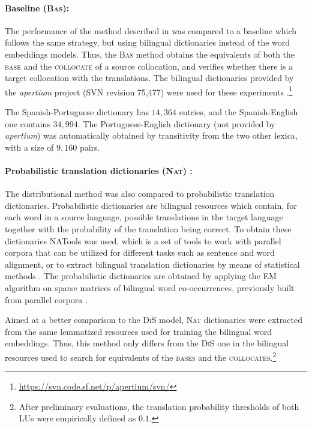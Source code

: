 \documentclass[output=paper
,modfonts
,nonflat]{langsci/langscibook}
\begin{document}
\paragraph*{Baseline (\textsc{Bas}):} The performance of the method described in 
was compared to a baseline which follows the same strategy, but using bilingual
dictionaries instead of the word embeddings models. Thus, the \textsc{Bas} method obtains the
equivalents of both the \textsc{base} and the \textsc{collocate} of a source collocation,
and verifies whether there is a target collocation with the translations. The bilingual
dictionaries provided by the \emph{apertium} project (SVN revision 75,477) were used for
these experiments \citep{apertium}.\footnote{\scriptsize{\url{https://svn.code.sf.net/p/apertium/svn/}}}

The Spanish-Portuguese dictionary has $14,364$ entries, and the Spanish-English one
contains $34,994$. The Portuguese-English dictionary (not provided by \emph{apertium})
was automatically obtained by transitivity from the two other lexica, with
a size of $9,160$ pairs.

\paragraph*{Probabilistic translation dictionaries (\textsc{Nat}) :} The distributional method
was also compared to probabilistic translation dictionaries. Probabilistic dictionaries are
bilingual resources which contain, for each word in a source language, possible translations
in the target language together with the probability of the translation being correct.
To obtain these dictionaries NATools was used, which is a set of tools to work with parallel corpora
that can be utilized for different tasks such as sentence and word alignment, or to extract bilingual
translation dictionaries by means of statistical methods \citep{natools}. The probabilistic dictionaries
are obtained by applying the EM algorithm on sparse matrices of bilingual word co-occurrences, previously
built from parallel corpora \citep{hiemstra1998}.

Aimed at a better comparison to the \textsc{DiS} model, \textsc{Nat} dictionaries were
extracted from the same lemmatized resources used for training the bilingual word embeddings.
Thus, this method only differs from the \textsc{DiS} one in the bilingual resources used to
search for equivalents of the \textsc{bases} and the \textsc{collocates}.\footnote{After preliminary
  evaluations, the translation probability thresholds of both LUs were empirically defined as $0.1$.}
\end{document}
